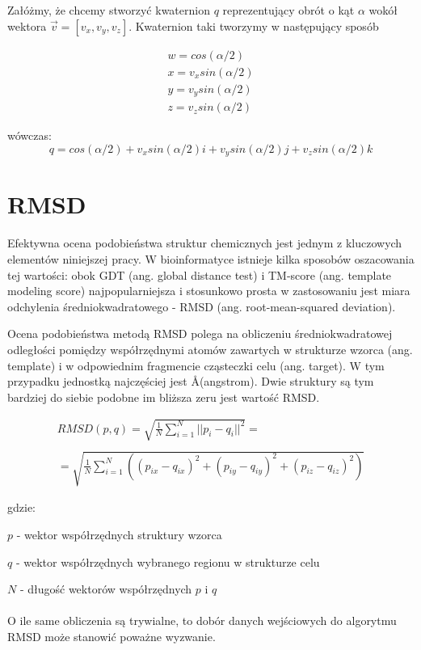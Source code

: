 \documentclass[licencjacka]{pracamgr}
\begin{document}
Załóżmy, że chcemy stworzyć kwaternion $q$ reprezentujący obrót o kąt $\alpha$ wokół wektora $\vec{v}=[v_x,v_y,v_z]$. Kwaternion taki tworzymy w następujący sposób

$$
\begin{array}{lr}
w=cos(\alpha/2) \\
x=v_x sin(\alpha/2) \\
y=v_y sin(\alpha/2) \\
z=v_z sin(\alpha/2) 
\end{array}
$$

wówczas:
$$
q=cos(\alpha/2)+v_xsin(\alpha/2)i+v_ysin(\alpha/2)j+v_zsin(\alpha/2)k
$$



\section{RMSD}
Efektywna ocena podobieństwa struktur chemicznych jest jednym z kluczowych elementów niniejszej pracy. W bioinformatyce istnieje kilka sposobów oszacowania tej wartości: obok GDT (ang. global distance test) i TM-score (ang. template modeling score) najpopularniejsza i stosunkowo prosta w zastosowaniu jest miara odchylenia średniokwadratowego - RMSD (ang. root-mean-squared deviation). 

Ocena podobieństwa metodą RMSD polega na obliczeniu średniokwadratowej odległości pomiędzy współrzędnymi atomów zawartych w strukturze wzorca (ang. template) i w odpowiednim fragmencie cząsteczki celu (ang. target). W tym przypadku jednostką najczęściej jest \AA (angstrom). Dwie struktury są tym bardziej do siebie podobne im bliższa zeru jest wartość RMSD.

$$
\begin{array}{lr}
RMSD(p,q) = \sqrt{\frac{1}{N}\sum_{i=1}^{N}||p_i-q_i||^{2}} = \\
\\
= \sqrt{\frac{1}{N}\sum_{i=1}^{N}((p_{ix}-q_{ix})^{2}+(p_{iy}-q_{iy})^{2}+(p_{iz}-q_{iz})^{2})}
\end{array}
$$

gdzie:

$p$ - wektor współrzędnych struktury wzorca

$q$ - wektor współrzędnych wybranego regionu w strukturze celu

$N$ - długość wektorów współrzędnych $p$ i $q$
\\
\\
O ile same obliczenia są trywialne, to dobór danych wejściowych do algorytmu RMSD może stanowić poważne wyzwanie. 
\end{document}
